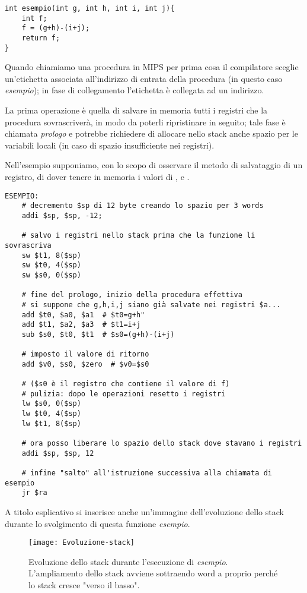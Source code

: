 \begin{verbatim}
int esempio(int g, int h, int i, int j){
	int f;
	f = (g+h)-(i+j);
	return f;
}
\end{verbatim}

Quando chiamiamo una procedura in MIPS per prima cosa il compilatore sceglie un’etichetta associata all’indirizzo di entrata della procedura (in questo caso \emph{esempio}); in fase di collegamento l'etichetta è collegata ad un indirizzo.

La prima operazione è quella di salvare in memoria tutti i registri che la procedura sovrascriverà, in modo da poterli ripristinare in seguito; tale fase è chiamata \emph{prologo} e potrebbe richiedere di allocare nello stack anche spazio per le variabili locali (in caso di spazio insufficiente nei registri).

Nell'esempio supponiamo, con lo scopo di osservare il metodo di salvataggio di un registro, di dover tenere in memoria i valori di ,  e .

\begin{verbatim}
ESEMPIO:
	# decremento $sp di 12 byte creando lo spazio per 3 words
	addi $sp, $sp, -12;

	# salvo i registri nello stack prima che la funzione li sovrascriva
	sw $t1, 8($sp)
	sw $t0, 4($sp)
	sw $s0, 0($sp)

	# fine del prologo, inizio della procedura effettiva
	# si suppone che g,h,i,j siano già salvate nei registri $a...
	add $t0, $a0, $a1  # $t0=g+h"
	add $t1, $a2, $a3  # $t1=i+j
	sub $s0, $t0, $t1  # $s0=(g+h)-(i+j)

	# imposto il valore di ritorno
	add $v0, $s0, $zero  # $v0=$s0

	# ($s0 è il registro che contiene il valore di f)
	# pulizia: dopo le operazioni resetto i registri
	lw $s0, 0($sp)
	lw $t0, 4($sp)
	lw $t1, 8($sp)

	# ora posso liberare lo spazio dello stack dove stavano i registri
	addi $sp, $sp, 12

	# infine "salto" all'istruzione successiva alla chiamata di esempio
	jr $ra
\end{verbatim}

A titolo esplicativo si inserisce anche un'immagine dell'evoluzione dello stack durante lo svolgimento di questa funzione \emph{esempio}.

\begin{figure}[H]
	\centering
	\caption{Evoluzione dello stack durante l'esecuzione di \emph{esempio}. L'ampliamento dello stack avviene sottraendo word a  proprio perché lo stack cresce "verso il basso".}
	\texttt{[image: Evoluzione-stack]}
\end{figure}

